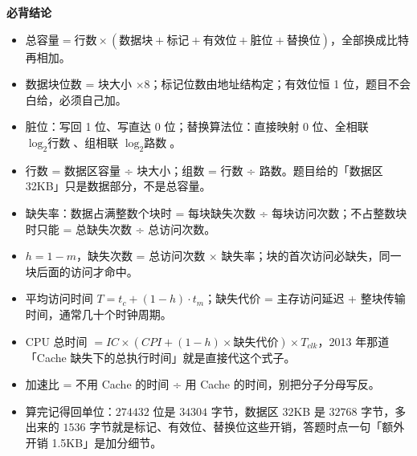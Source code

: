\documentclass[10pt,a4paper]{ctexart}
\begin{document}



\textbf{必背结论}

\begin{itemize}

\item $\text{总容量}=\text{行数}\times(\text{数据块}+\text{标记}+\text{有效位}+\text{脏位}+\text{替换位})$，全部换成比特再相加。

\item 数据块位数 = 块大小 $\times 8$；标记位数由地址结构定；有效位恒 1 位，题目不会白给，必须自己加。

\item 脏位：写回 1 位、写直达 0 位；替换算法位：直接映射 0 位、全相联 $\log_2\text{行数}$、组相联 $\log_2\text{路数}$。

\item 行数 = 数据区容量 ÷ 块大小；组数 = 行数 ÷ 路数。题目给的「数据区 32KB」只是数据部分，不是总容量。

\item 缺失率：数据占满整数个块时 = 每块缺失次数 ÷ 每块访问次数；不占整数块时只能 = 总缺失次数 ÷ 总访问次数。

\item $h=1-m$，缺失次数 = 总访问次数 $\times$ 缺失率；块的首次访问必缺失，同一块后面的访问才命中。

\item 平均访问时间 $T=t_c+(1-h)\cdot t_m$；缺失代价 = 主存访问延迟 + 整块传输时间，通常几十个时钟周期。

\item CPU 总时间 $=IC\times(CPI+(1-h)\times\text{缺失代价})\times T_{clk}$，2013 年那道「Cache 缺失下的总执行时间」就是直接代这个式子。

\item 加速比 = 不用 Cache 的时间 ÷ 用 Cache 的时间，别把分子分母写反。

\item 算完记得回单位：$274432$ 位是 $34304$ 字节，数据区 $32$KB 是 $32768$ 字节，多出来的 $1536$ 字节就是标记、有效位、替换位这些开销，答题时点一句「额外开销 1.5KB」是加分细节。

\end{itemize}
\end{document}

